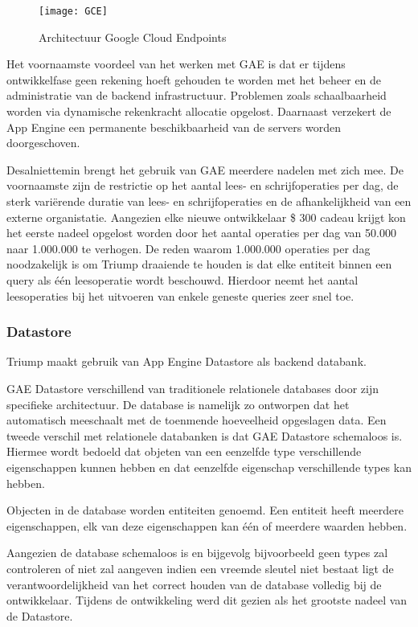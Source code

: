 \begin{figure}[H]
	\centering
	\texttt{[image: GCE]}
	\caption{Architectuur Google Cloud Endpoints}
	\label{fig:Architectuur Google Cloud Endpoints}
\end{figure}

Het voornaamste voordeel van het werken met GAE is dat er tijdens ontwikkelfase geen rekening hoeft gehouden te worden met het  beheer en de administratie van de backend infrastructuur. Problemen zoals schaalbaarheid worden via dynamische rekenkracht allocatie opgelost. Daarnaast verzekert de App Engine een permanente beschikbaarheid van de servers worden doorgeschoven.

Desalniettemin brengt het gebruik van GAE meerdere nadelen met zich mee. De voornaamste zijn de restrictie op het aantal lees- en schrijfoperaties per dag, de sterk variërende duratie van lees- en schrijfoperaties en de afhankelijkheid van een externe organistatie. Aangezien elke nieuwe ontwikkelaar \$ 300 cadeau krijgt kon het eerste nadeel opgelost worden door het aantal operaties per dag van 50.000 naar 1.000.000 te verhogen. De reden waarom 1.000.000 operaties per dag noodzakelijk is om Triump draaiende te houden is dat elke entiteit binnen een query als één leesoperatie wordt beschouwd. Hierdoor neemt het aantal leesoperaties bij het uitvoeren van enkele geneste queries zeer snel toe.

\subsubsection{Datastore}

Triump maakt gebruik van App Engine Datastore als backend databank.

GAE Datastore verschillend van traditionele relationele databases door zijn specifieke architectuur. De database is namelijk zo ontworpen dat het automatisch meeschaalt met de toenmende hoeveelheid opgeslagen data. Een tweede verschil met relationele databanken is dat GAE Datastore schemaloos is. Hiermee wordt bedoeld dat objeten van een eenzelfde type verschillende eigenschappen kunnen hebben en dat eenzelfde eigenschap verschillende types kan hebben. 

Objecten in de database worden entiteiten genoemd. Een entiteit heeft meerdere eigenschappen, elk van deze eigenschappen kan één of meerdere waarden hebben. 

Aangezien de database schemaloos is en bijgevolg bijvoorbeeld geen types zal controleren of niet zal aangeven indien een vreemde sleutel niet bestaat ligt de verantwoordelijkheid van het correct houden van de database volledig bij de ontwikkelaar. Tijdens de ontwikkeling werd dit gezien als het grootste nadeel van de Datastore.

